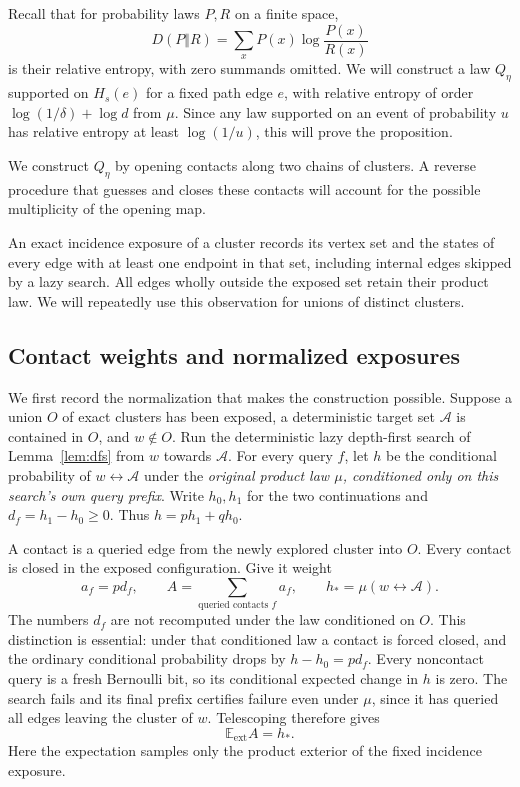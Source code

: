 \documentclass[11pt]{article}
\theoremstyle{definition}
\begin{document}
Recall that for probability laws $P,R$ on a finite space,
\[
 D(P\Vert R)=\sum_x P(x)\log\frac{P(x)}{R(x)}
\]
is their relative entropy, with zero summands omitted. We will construct
a law $Q_\eta$ supported on $H_s(e)$ for a fixed path edge $e$, with
relative entropy of order $\log(1/\delta)+\log d$ from $\mu$.
Since any law supported on an event of probability $u$ has relative
entropy at least $\log(1/u)$, this will prove the proposition.

We construct $Q_\eta$ by opening contacts along two chains of clusters.
A reverse procedure that guesses and closes these contacts will account
for the possible multiplicity of the opening map.

An exact incidence exposure of a cluster records its vertex set and the
states of every edge with at least one endpoint in that set, including
internal edges skipped by a lazy search. All edges wholly outside the
exposed set retain their product law. We will repeatedly use this
observation for unions of distinct clusters.

\subsection{Contact weights and normalized exposures}

We first record the normalization that makes the construction possible.
Suppose a union $O$ of exact clusters has been exposed, a deterministic
target set $\mathcal A$ is contained in $O$, and $w\notin O$.
Run the deterministic lazy depth-first search of Lemma~\ref{lem:dfs}
from $w$ towards $\mathcal A$. For every query $f$, let $h$ be the
conditional probability of $w\leftrightarrow\mathcal A$ under the
\emph{original product law $\mu$, conditioned only on this search's
own query prefix}. Write $h_0,h_1$ for the two continuations and
$d_f=h_1-h_0\ge0$. Thus $h=ph_1+qh_0$.

A contact is a queried edge from the newly explored cluster into $O$.
Every contact is closed in the exposed configuration. Give it weight
\[
 a_f=pd_f,
 \qquad A=\sum_{\text{queried contacts }f}a_f,
 \qquad h_* =\mu(w\leftrightarrow\mathcal A).
\]
The numbers $d_f$ are not recomputed under the law conditioned on $O$.
This distinction is essential: under that conditioned law a contact is
forced closed, and the ordinary conditional probability drops by
$h-h_0=pd_f$. Every noncontact query is a fresh Bernoulli bit, so its
conditional expected change in $h$ is zero. The search fails and its
final prefix certifies failure even under $\mu$, since it has queried
all edges leaving the cluster of $w$. Telescoping therefore gives
\begin{equation}\label{eq:contact-normalization}
 \mathbb E_{\mathrm{ext}}A=h_*.
\end{equation}
Here the expectation samples only the product exterior of the fixed
incidence exposure.
\end{document}
